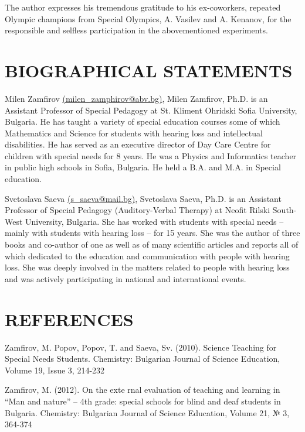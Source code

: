 \documentclass[11.5pt]{sig-alternate} %
\begin{document}
\begin{large}
The author expresses his tremendous gratitude to his ex-coworkers, repeated Olympic champions from Special Olympics, A. Vasilev and A. Kenanov, for the responsible and selfless participation in the abovementioned experiments.

\section*{BIOGRAPHICAL STATEMENTS}

Milen Zamfirov \href{mailto:milen_zamphirov@abv.bg}{(milen\_zamphirov@abv.bg)}, Mil\-en Zamfirov, Ph.D. is an Assistant Professor of Special Pedagogy at St. Kliment Ohridski Sofia University, Bulgaria. He has taught a variety of special education courses some of which Mathematics and Science for students with hearing loss and intellectual disabilities. He has served as an executive director of Day Care Centre for children with special needs for 8 years. He was a Physics and Informatics teacher in public high schools in Sofia, Bulgaria. He held a B.A. and M.A. in Special education.

Svetoslava Saeva \href{mailto:s_saeva@mail.bg}{(s\_saeva@mail.bg)}, Svetoslava Saeva, Ph.D. is an Assistant Professor of Special Pedagogy (Auditory-Verbal Therapy) at Neofit Rilski South-West University, Bulgaria. She has worked with students with special needs – mainly with students with hearing loss – for 15 years. She was the author of three books and co-author of one as well as of many scientific articles and reports all of which dedicated to the education and communication with people with hearing loss. She was deeply involved in the matters related to people with hearing loss and was actively participating in national and international events.

\end{large}

\clearpage
\section*{REFERENCES}\par 

\leftskip 0.25in
\parindent -0.25in 

Zamfirov, M. Popov, Popov, T. and Saeva, Sv. (2010). Science Teaching for Special Needs Students. Chemistry: Bulgarian Journal of Science Education, Volume 19, Issue 3, 214-232

Zamfirov, M. (2012). On the exte rnal evaluation of teaching and learning in “Man and nature” – 4th grade: special schools for blind and deaf students in Bulgaria. Chemistry: Bulgarian Journal of Science Education, Volume 21, № 3, 364-374
\end{document}
